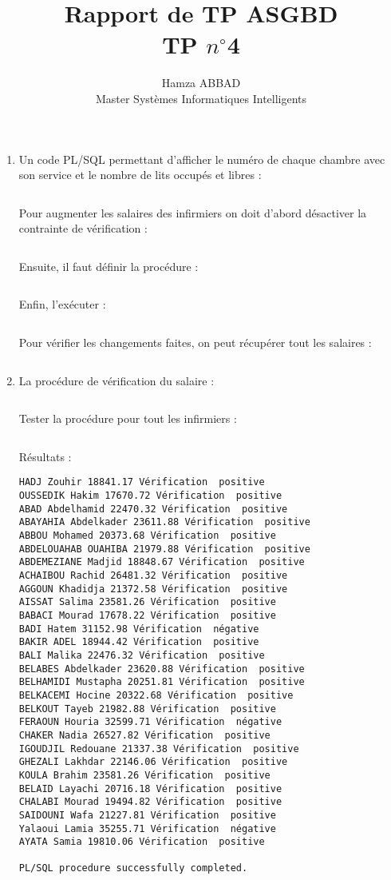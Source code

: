 \documentclass[12pt,a4paper]{article}
\author{Hamza ABBAD\\ Master Systèmes Informatiques Intelligents}
\title{\textbf{Rapport de TP ASGBD} \\ TP $n^{\circ}$4}
\begin{document}
\maketitle
\begin{enumerate}
    \item Un code PL/SQL permettant d'afficher le numéro de chaque chambre avec son
    service et le nombre de lits occupés et libres :
    \inputminted[firstline=4, lastline=18]{SQL}{../Scripts/TP4.sql}
    Pour augmenter les salaires des infirmiers on doit d'abord désactiver la contrainte de vérification :
    \inputminted[firstline=21, lastline=21]{SQL}{../Scripts/TP4.sql}
    Ensuite, il faut définir la procédure :
    \inputminted[firstline=22, lastline=29]{SQL}{../Scripts/TP4.sql}
    Enfin, l'exécuter :
    \inputminted[firstline=30, lastline=30]{SQL}{../Scripts/TP4.sql}
    Pour vérifier les changements faites, on peut récupérer tout les salaires :
    \inputminted[firstline=31, lastline=31]{SQL}{../Scripts/TP4.sql}
    \item La procédure de vérification du salaire :
    \inputminted[firstline=34, lastline=40]{SQL}{../Scripts/TP4.sql}
    Tester la procédure pour tout les infirmiers :
    \inputminted[firstline=42, lastline=50]{SQL}{../Scripts/TP4.sql}
    Résultats :
    \begin{oframed}
        \begin{verbatim}
HADJ Zouhir 18841.17 Vérification  positive
OUSSEDIK Hakim 17670.72 Vérification  positive
ABAD Abdelhamid 22470.32 Vérification  positive
ABAYAHIA Abdelkader 23611.88 Vérification  positive
ABBOU Mohamed 20373.68 Vérification  positive
ABDELOUAHAB OUAHIBA 21979.88 Vérification  positive
ABDEMEZIANE Madjid 18848.67 Vérification  positive
ACHAIBOU Rachid 26481.32 Vérification  positive
AGGOUN Khadidja 21372.58 Vérification  positive
AISSAT Salima 23581.26 Vérification  positive
BABACI Mourad 17678.22 Vérification  positive
BADI Hatem 31152.98 Vérification  négative
BAKIR ADEL 18944.42 Vérification  positive
BALI Malika 22476.32 Vérification  positive
BELABES Abdelkader 23620.88 Vérification  positive
BELHAMIDI Mustapha 20251.81 Vérification  positive
BELKACEMI Hocine 20322.68 Vérification  positive
BELKOUT Tayeb 21982.88 Vérification  positive
FERAOUN Houria 32599.71 Vérification  négative
CHAKER Nadia 26527.82 Vérification  positive
IGOUDJIL Redouane 21337.38 Vérification  positive
GHEZALI Lakhdar 22146.06 Vérification  positive
KOULA Brahim 23581.26 Vérification  positive
BELAID Layachi 20716.18 Vérification  positive
CHALABI Mourad 19494.82 Vérification  positive
SAIDOUNI Wafa 21227.81 Vérification  positive
Yalaoui Lamia 35255.71 Vérification  négative
AYATA Samia 19810.06 Vérification  positive

PL/SQL procedure successfully completed.
        \end{verbatim}
    \end{oframed}
    \end{enumerate}
\end{document}
